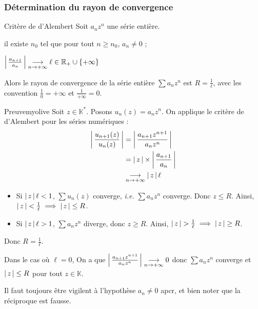     \subsubsection{Détermination du rayon de convergence}

    \begin{prop}{Critère de d’Alembert}{}
        Soit $a_n z^n$ une série entière.
        \begin{suppose}
            \item il existe $n_0$ tel que pour tout $n \geq n_0$, $a_n \neq 0$ ;
            \item $\left\lvert \,\frac{a_{n+1}}{a_n} \, \right\rvert \underset{n \rightarrow +\infty}{\longrightarrow} \ell \in \mathbb{R}_+ \cup \{+\infty\}$
        \end{suppose}
        Alors le rayon de convergence de la série entière $\sum a_n z^n$ est $R = \frac{1}{\ell}$, avec les convention $\frac{1}{0} = +\infty$ et $\frac{1}{+\infty} = 0$.
    \end{prop}

    \begin{demo}{Preuve}{myolive}
        Soit $z \in \mathbb{K}^*$. Posons $u_n(z) = a_n z^n$. On applique le critère de d’Alembert pour les séries numériques :
        \begin{align*}
            \left\lvert \,\frac{u_{n+1}(z)}{u_{n}(z)} \, \right\rvert &= \left\lvert \,\frac{a_{n+1} z^{n+1}}{a_n z^n} \, \right\rvert \\
            &= \left\lvert \,z \, \right\rvert \times \left\lvert \,\frac{a_{n+1}}{a_n} \, \right\rvert \\
            &\underset{n \rightarrow +\infty}{\longrightarrow} \left\lvert \,z \, \right\rvert \ell
        \end{align*}
        \begin{itemize}
            \item Si $\left\lvert \,z \, \right\rvert \ell < 1$, $\sum u_n(z)$ converge, \textit{i.e.} $\sum a_n z^n$ converge. Donc $z \leq R$. Ainsi, $\left\lvert \,z \, \right\rvert < \frac{1}{\ell} \implies \left\lvert \,z \, \right\rvert \leq R$.
            \item Si $\left\lvert \,z \, \right\rvert \ell > 1$, $\sum a_n z^n$ diverge, donc $z \geq R$. Ainsi, $\left\lvert \,z \, \right\rvert > \frac{1}{\ell} \implies \left\lvert \,z \, \right\rvert \geq R$.
        \end{itemize}
        Donc $R = \frac{1}{\ell}$. 

        Dans le cas où $\ell = 0$, On a que $\left\lvert \,\frac{a_{n+1} z^{n+1}}{a_n z^n} \, \right\rvert \underset{n \rightarrow +\infty}{\longrightarrow} 0$ donc $\sum a_n z^n$ converge et $\left\lvert \,z \, \right\rvert \leq R$ pour tout $z \in \mathbb{K}$.
    \end{demo}

    Il faut toujours être vigilent à l’hypothèse $a_n \neq 0$ apcr, et bien noter que la réciproque est fausse.


